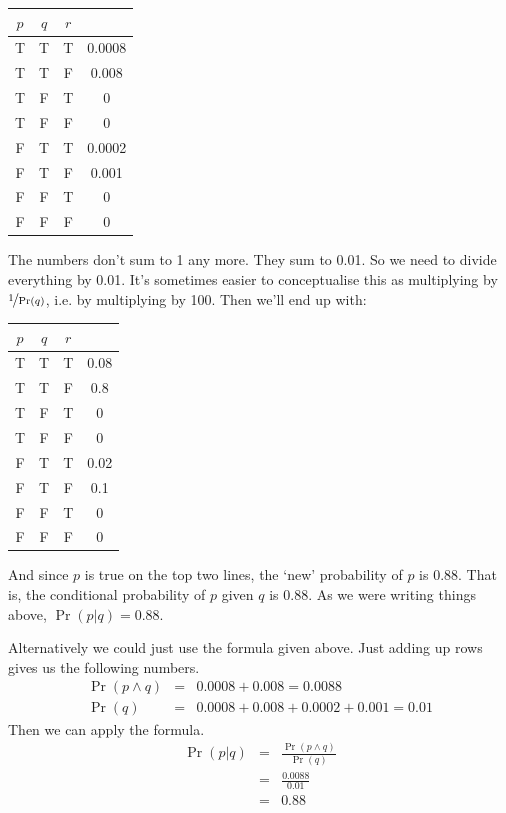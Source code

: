 \documentclass[openany]{book}
\begin{document}
\begin{center} \begin{tabular}{c c c | c}
$p$ & $q$ & $r$ \\ \hline
T & T & T & 0.0008\\
T & T & F & 0.008\\
T & F & T & 0\\
T & F & F & 0\\
F & T & T & 0.0002\\
F & T & F & 0.001\\
F & F & T & 0\\
F & F & F & 0
\end{tabular} \end{center} 
The numbers don't sum to 1 any more. They sum to 0.01. So we need to divide everything by 0.01. It's sometimes easier to conceptualise this as multiplying by $\nicefrac{1}{\Pr(q)}$, i.e. by multiplying by 100. Then we'll end up with:

\begin{center} \begin{tabular}{c c c | c}
$p$ & $q$ & $r$ \\ \hline
T & T & T & 0.08\\
T & T & F & 0.8\\
T & F & T & 0\\
T & F & F & 0\\
F & T & T & 0.02\\
F & T & F & 0.1\\
F & F & T & 0\\
F & F & F & 0
\end{tabular}
\end{center} 
And since $p$ is true on the top two lines, the `new' probability of $p$ is 0.88. That is, the conditional probability of $p$ given $q$ is 0.88. As we were writing things above, $\Pr(p | q) = 0.88$.

Alternatively we could just use the formula given above. Just adding up rows gives us the following numbers.
\begin{eqnarray*}
\Pr(p \wedge q) &=& 0.0008 + 0.008 = 0.0088 \\
\Pr(q) &=& 0.0008 + 0.008 + 0.0002 + 0.001 = 0.01
\end{eqnarray*} Then we can apply the formula.
\begin{eqnarray*}
\Pr(p | q) &=& \frac{\Pr(p \wedge q)}{\Pr(q)} \\
&=& \frac{0.0088}{0.01} \\
&=& 0.88
\end{eqnarray*}
\end{document}
